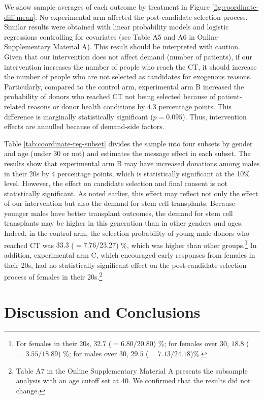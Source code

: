 \documentclass[12pt, a4paper]{article}
\begin{document}
We show sample averages of each outcome by treatment in Figure \ref{fig:coordinate-diff-mean}. No experimental arm affected the post-candidate selection process. Similar results were obtained with linear probability models and logistic regressions controlling for covariates (see Table A5 and A6 in Online Supplementary Material A). This result should be interpreted with caution. Given that our intervention does not affect demand (number of patients), if our intervention increases the number of people who reach the CT, it should increase the number of people who are not selected as candidates for exogenous reasons. Particularly, compared to the control arm, experimental arm B increased the probability of donors who reached CT not being selected because of patient-related reasons or donor health conditions by \(4.3\) percentage points. This difference is marginally statistically significant (\(p = 0.095\)). Thus, intervention effects are annulled because of demand-side factors.

Table \ref{tab:coordinate-reg-subset} divides the sample into four subsets by gender and age (under 30 or not) and estimates the message effect in each subset. The results show that experimental arm B may have increased donations among males in their 20s by 4 percentage points, which is statistically significant at the 10\% level. However, the effect on candidate selection and final consent is not statistically significant. As noted earlier, this effect may reflect not only the effect of our intervention but also the demand for stem cell transplants. Because younger males have better transplant outcomes, the demand for stem cell transplants may be higher in this generation than in other genders and ages. Indeed, in the control arm, the selection probability of young male donors who reached CT was \(33.3\) (\(=7.76/23.27\)) \%, which was higher than other groups.\footnote{For females in their 20s, \(32.7\) (\(=6.80 / 20.80\)) \%; for females over 30, \(18.8\) (\(=3.55 / 18.89\)) \%; for males over 30, \(29.5\) (\(=7.13/24.18\))\%.} In addition, experimental arm C, which encouraged early responses from females in their 20s, had no statistically significant effect on the post-candidate selection process of females in their 20s.\footnote{Table A7 in the Online Supplementary Material A presents the subsample analysis with an age cutoff set at 40. We confirmed that the results did not change.}

\hypertarget{conclusion}{%
\section{Discussion and Conclusions}\label{conclusion}}
\end{document}
